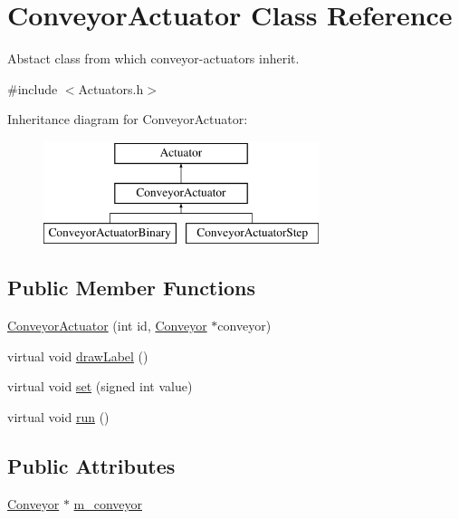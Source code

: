 \hypertarget{classConveyorActuator}{\section{Conveyor\-Actuator Class Reference}
\label{classConveyorActuator}
}


Abstact class from which conveyor-\/actuators inherit.  




{\ttfamily \#include $<$Actuators.\-h$>$}

Inheritance diagram for Conveyor\-Actuator\-:\begin{figure}[H]
\begin{center}
\leavevmode
\includegraphics[height=3.000000cm]{classConveyorActuator}
\end{center}
\end{figure}
\subsection*{Public Member Functions}
\begin{DoxyCompactItemize}
\item 
\hyperlink{classConveyorActuator_a264ec9b8887442a47d63ce91a9d017ea}{Conveyor\-Actuator} (int id, \hyperlink{classConveyor}{Conveyor} $\ast$conveyor)
\item 
virtual void \hyperlink{classConveyorActuator_a92b62d5cb761e808337d3b9de910a543}{draw\-Label} ()
\item 
virtual void \hyperlink{classConveyorActuator_a4eeadeec24502aed450880cba04e2784}{set} (signed int value)
\item 
virtual void \hyperlink{classConveyorActuator_a0df274add7b944f869e9486fce8240b1}{run} ()
\end{DoxyCompactItemize}
\subsection*{Public Attributes}
\begin{DoxyCompactItemize}
\item 
\hyperlink{classConveyor}{Conveyor} $\ast$ \hyperlink{classConveyorActuator_a45ff28827d8db7a844b0043383489b7a}{m\-\_\-conveyor}
\end{DoxyCompactItemize}



